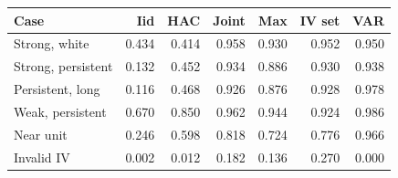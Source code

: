 \begin{tabular}{lrrrrrr}
\toprule
Case & Iid & HAC & Joint & Max & IV set & VAR\\
\midrule
Strong, white & 0.434 & 0.414 & 0.958 & 0.930 & 0.952 & 0.950\\
Strong, persistent & 0.132 & 0.452 & 0.934 & 0.886 & 0.930 & 0.938\\
Persistent, long & 0.116 & 0.468 & 0.926 & 0.876 & 0.928 & 0.978\\
Weak, persistent & 0.670 & 0.850 & 0.962 & 0.944 & 0.924 & 0.986\\
Near unit & 0.246 & 0.598 & 0.818 & 0.724 & 0.776 & 0.966\\
Invalid IV & 0.002 & 0.012 & 0.182 & 0.136 & 0.270 & 0.000\\
\bottomrule
\end{tabular}
